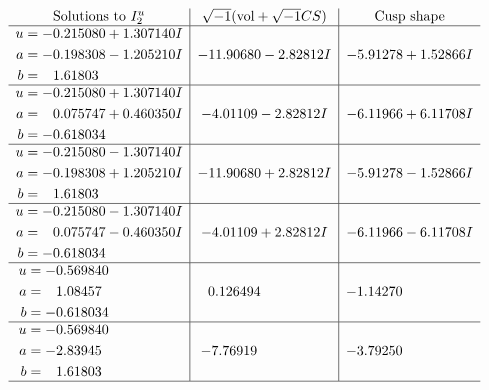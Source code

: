\documentclass[1p]{elsarticle_modified}
\theoremstyle{definition}
\newcommand{\I}{\sqrt{-1}}
\begin{document}
$$\begin{array}{c|c|c}  
\text{Solutions to }I^u_{2}& \I (\text{vol} + \sqrt{-1}CS) & \text{Cusp shape}\\
 \hline 
\begin{aligned}
u &= -0.215080 + 1.307140 I \\
a &= -0.198308 - 1.205210 I \\
b &= \phantom{-}1.61803\phantom{ +0.000000I}\end{aligned}
 & -11.90680 - 2.82812 I & -5.91278 + 1.52866 I \\ \hline\begin{aligned}
u &= -0.215080 + 1.307140 I \\
a &= \phantom{-}0.075747 + 0.460350 I \\
b &= -0.618034\phantom{ +0.000000I}\end{aligned}
 & -4.01109 - 2.82812 I & -6.11966 + 6.11708 I \\ \hline\begin{aligned}
u &= -0.215080 - 1.307140 I \\
a &= -0.198308 + 1.205210 I \\
b &= \phantom{-}1.61803\phantom{ +0.000000I}\end{aligned}
 & -11.90680 + 2.82812 I & -5.91278 - 1.52866 I \\ \hline\begin{aligned}
u &= -0.215080 - 1.307140 I \\
a &= \phantom{-}0.075747 - 0.460350 I \\
b &= -0.618034\phantom{ +0.000000I}\end{aligned}
 & -4.01109 + 2.82812 I & -6.11966 - 6.11708 I \\ \hline\begin{aligned}
u &= -0.569840\phantom{ +0.000000I} \\
a &= \phantom{-}1.08457\phantom{ +0.000000I} \\
b &= -0.618034\phantom{ +0.000000I}\end{aligned}
 & \phantom{-}0.126494\phantom{ +0.000000I} & -1.14270\phantom{ +0.000000I} \\ \hline\begin{aligned}
u &= -0.569840\phantom{ +0.000000I} \\
a &= -2.83945\phantom{ +0.000000I} \\
b &= \phantom{-}1.61803\phantom{ +0.000000I}\end{aligned}
 & -7.76919\phantom{ +0.000000I} & -3.79250\phantom{ +0.000000I}\\
 \hline 
 \end{array}$$\newpage
\end{document}

